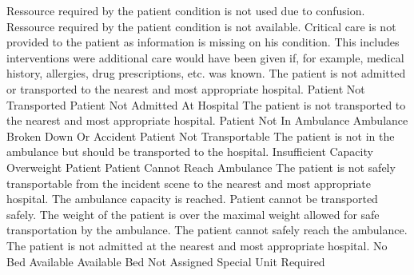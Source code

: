 	 {Ressource required by the patient condition is not used due to confusion.}
\stopkaosspec
\startkaosspec
	 {Ressource required by the patient condition is not available.}
\stopkaosspec
\startkaosspec
	 {Critical care is not provided to the patient as information is missing on his condition. This includes interventions were additional care would have been given if, for example, medical history, allergies, drug prescriptions, etc. was known.}
\stopkaosspec
\startkaosspec
	 {The patient is not admitted or transported to the nearest and most appropriate hospital.}
	 {Patient Not Transported}
	 {Patient Not Admitted At Hospital}
\stopkaosspec
\startkaosspec
	 {The patient is not transported to the nearest and most appropriate hospital.}
	 {Patient Not In Ambulance}
	 {Ambulance Broken Down Or Accident}
	 {Patient Not Transportable}
\stopkaosspec
\startkaosspec
	 {The patient is not in the ambulance but should be transported to the hospital.}
	 {Insufficient Capacity}
	 {Overweight Patient}
	 {Patient Cannot Reach Ambulance}
\stopkaosspec
\startkaosspec
	 {The patient is not safely transportable from the incident scene to the nearest and most appropriate hospital.}
\stopkaosspec
\startkaosspec
	 {The ambulance capacity is reached. Patient cannot be transported safely.}
\stopkaosspec
\startkaosspec
	 {The weight of the patient is over the maximal weight allowed for safe transportation by the ambulance.}
\stopkaosspec
\startkaosspec
	 {The patient cannot safely reach the ambulance.}
\stopkaosspec
\startkaosspec
	 {The patient is not admitted at the nearest and most appropriate hospital.}
	 {No Bed Available}
	 {Available Bed Not Assigned}
	 {Special Unit Required}
